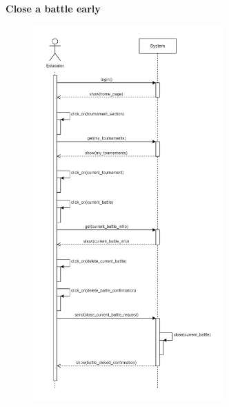 \documentclass[../RASD.tex]{subfiles}
\begin{document}
    \textbf{Close a battle early}
    \begin{figure}[h!]
        \centering
        \hspace*{1cm}
        \includegraphics[width=0.65\textwidth]{../assets/section_3/CloseABattleEarly.png}
        \hspace*{-1cm}
    \end{figure}
    \newpage
    \restoregeometry
\end{document}

